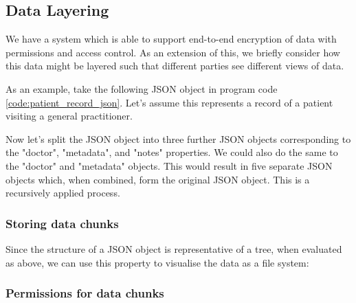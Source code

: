 \subsection{Data Layering}

We have a system which is able to support end-to-end encryption of data with permissions and access control. As an extension of this, we briefly consider how this data might be layered such that different parties see different views of data.

As an example, take the following JSON object in program code \ref{code:patient_record_json}. Let's assume this represents a record of a patient visiting a general practitioner.



Now let's split the JSON object into three further JSON objects corresponding to the "doctor", "metadata", and "notes" properties. We could also do the same to the "doctor" and "metadata" objects. This would result in five separate JSON objects which, when combined, form the original JSON object. This is a recursively applied process.

\subsubsection{Storing data chunks}

Since the structure of a JSON object is representative of a tree, when evaluated as above, we can use this property to visualise the data as a file system:



\subsubsection{Permissions for data chunks}
